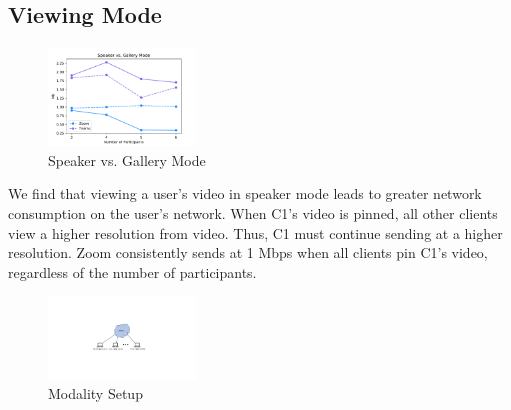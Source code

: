 \subsection{Viewing Mode}
\begin{figure}[]
    \includegraphics[width=0.35\textwidth,keepaspectratio]{../figures/modality/call_modality.pdf}
    \caption{Speaker vs. Gallery Mode}
    \label{fig:loss_latency}
\end{figure}
We find that viewing a user's video in speaker mode leads to greater network consumption on the user's network. When C1's video is pinned, all other clients view a higher resolution from video. Thus, C1 must continue sending at a higher resolution. Zoom consistently sends at 1 Mbps when all clients pin C1's video, regardless of the number of participants. 
\begin{figure}[]
    \includegraphics[width=0.35\textwidth,keepaspectratio]{../figures/methodology/modality-setup.pdf}
    \caption{Modality Setup}
    \label{fig:loss_latency}
\end{figure}
